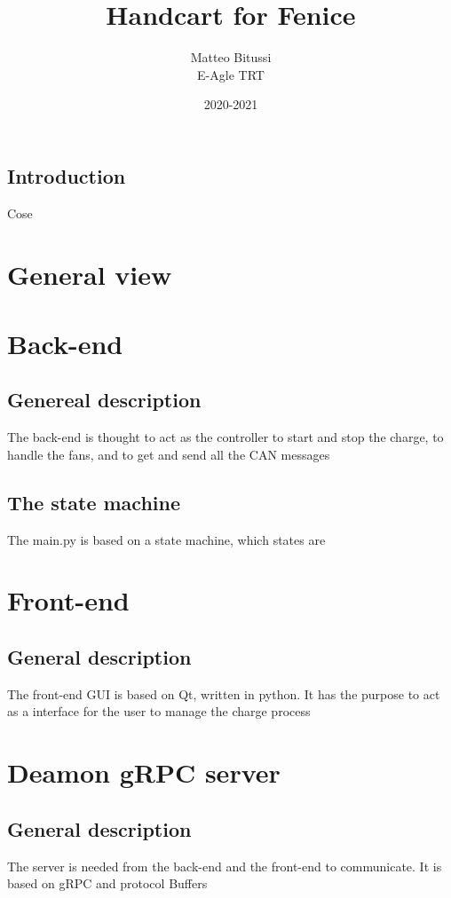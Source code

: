 \documentclass[a4paper]{report}
\title{Handcart for Fenice}
\author{Matteo Bitussi \\ E-Agle TRT}
\date{2020-2021}
\begin{document}
  \maketitle

  \tableofcontents

  \section*{Introduction}
  Cose

  \chapter{General view}

  \chapter{Back-end}
  \section{Genereal description}
  The back-end is thought to act as the controller to start and stop the charge, to handle the fans, and to get and send all the CAN messages

  \section{The state machine}
  The main.py is based on a state machine, which states are

  \chapter{Front-end}
  \section{General description}
  The front-end GUI is based on Qt, written in python. It has the purpose to act as a interface for the user to manage the charge process

  \chapter{Deamon gRPC server}
  \section{General description}
  The server is needed from the back-end and the front-end to communicate. It is based on gRPC and protocol Buffers
\end{document}
